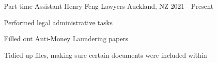 \begin{cventries}
  \cventry
    {Part-time Assistant} %
    {Henry Feng Lawyers} %
    {Auckland, NZ} %
    {2021 - Present} %
    {
      \begin{cvitems} %
        \item {Performed legal administrative tasks}
        \item {Filled out Anti-Money Laundering papers}
        \item {Tidied up files, making sure certain documents were included within}
      \end{cvitems}
    }


\end{cventries}
